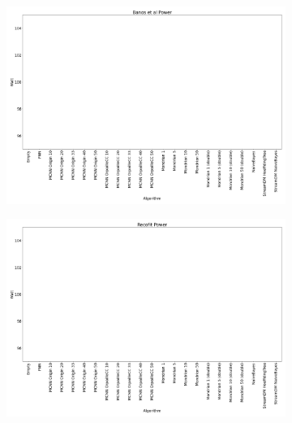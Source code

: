 \begin{figure}
	\begin{subfigure}[t]{.49\linewidth}
		\includegraphics[width=\linewidth]{figures/results/banos_3_watt.png}
		\caption{\banosdataset}
		\label{fig:power-banos}
	\end{subfigure}
	\hfill
	\begin{subfigure}[t]{.49\linewidth}
		\includegraphics[width=\linewidth]{figures/results/recofit_3_watt.png}
		\caption{\recofitdataset}
		\label{fig:power-recofit}
	\end{subfigure}\\
	\begin{subfigure}[t]{.49\linewidth}

\end{subfigure}
\end{figure}
